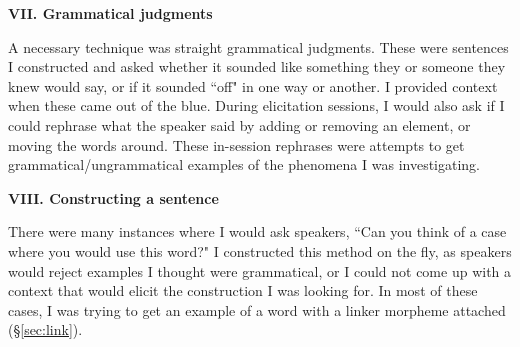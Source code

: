 \vspace{8pt}

\noindent \textbf{VII. Grammatical judgments}

A necessary technique was straight grammatical judgments. These were sentences I constructed and asked whether it sounded like something they or someone they knew would say, or if it sounded ``off" in one way or another. I provided context when these came out of the blue. During elicitation sessions, I would also ask if I could rephrase what the speaker said by adding or removing an element, or moving the words around. These in-session rephrases were attempts to get grammatical/ungrammatical examples of the phenomena I was investigating.

\vspace{8pt}

\noindent \textbf{VIII. Constructing a sentence}

There were many instances where I would ask speakers, ``Can you think of a case where you would use this word?" I constructed this method on the fly, as speakers would reject examples I thought were grammatical, or I could not come up with a context that would elicit the construction I was looking for. In most of these cases, I was trying to get an example of a word with a linker morpheme attached (\S\ref{sec:link}).


